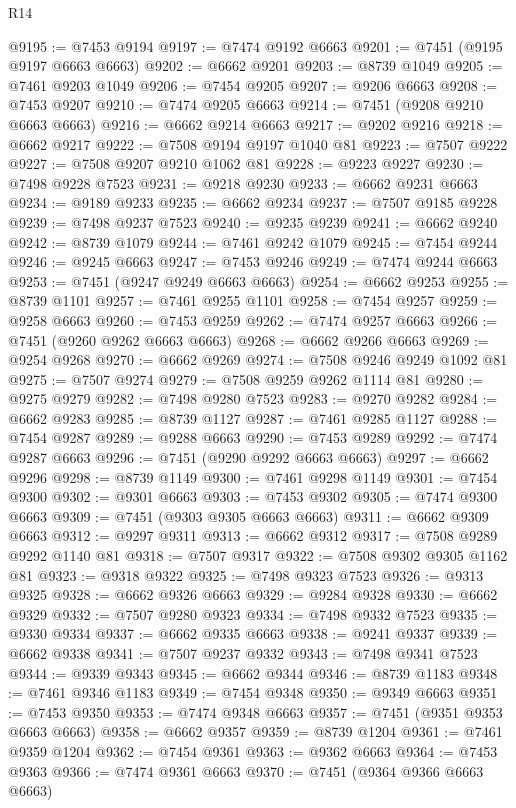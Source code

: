 \begin{lexlean}{R14}
\begin{coremodule}
{{{{{{{{{{{{{{{{{{{{{{{{{{{{{{{{{{{{{{{{{{{{{{{{{{{{{{{{{{{{{{{{{{{{{{{{{{{{{{{{{{@9195 := @7453 @9194
@9197 := @7474 @9192 @6663
@9201 := @7451 (@9195 @9197 @6663 @6663)
@9202 := @6662 @9201
@9203 := @8739 @1049
@9205 := @7461 @9203 @1049
@9206 := @7454 @9205
@9207 := @9206 @6663
@9208 := @7453 @9207
@9210 := @7474 @9205 @6663
@9214 := @7451 (@9208 @9210 @6663 @6663)
@9216 := @6662 @9214 @6663
@9217 := @9202 @9216
@9218 := @6662 @9217
@9222 := @7508 @9194 @9197 @1040 @81
@9223 := @7507 @9222
@9227 := @7508 @9207 @9210 @1062 @81
@9228 := @9223 @9227
@9230 := @7498 @9228 @7523
@9231 := @9218 @9230
@9233 := @6662 @9231 @6663
@9234 := @9189 @9233
@9235 := @6662 @9234
@9237 := @7507 @9185 @9228
@9239 := @7498 @9237 @7523
@9240 := @9235 @9239
@9241 := @6662 @9240
@9242 := @8739 @1079
@9244 := @7461 @9242 @1079
@9245 := @7454 @9244
@9246 := @9245 @6663
@9247 := @7453 @9246
@9249 := @7474 @9244 @6663
@9253 := @7451 (@9247 @9249 @6663 @6663)
@9254 := @6662 @9253
@9255 := @8739 @1101
@9257 := @7461 @9255 @1101
@9258 := @7454 @9257
@9259 := @9258 @6663
@9260 := @7453 @9259
@9262 := @7474 @9257 @6663
@9266 := @7451 (@9260 @9262 @6663 @6663)
@9268 := @6662 @9266 @6663
@9269 := @9254 @9268
@9270 := @6662 @9269
@9274 := @7508 @9246 @9249 @1092 @81
@9275 := @7507 @9274
@9279 := @7508 @9259 @9262 @1114 @81
@9280 := @9275 @9279
@9282 := @7498 @9280 @7523
@9283 := @9270 @9282
@9284 := @6662 @9283
@9285 := @8739 @1127
@9287 := @7461 @9285 @1127
@9288 := @7454 @9287
@9289 := @9288 @6663
@9290 := @7453 @9289
@9292 := @7474 @9287 @6663
@9296 := @7451 (@9290 @9292 @6663 @6663)
@9297 := @6662 @9296
@9298 := @8739 @1149
@9300 := @7461 @9298 @1149
@9301 := @7454 @9300
@9302 := @9301 @6663
@9303 := @7453 @9302
@9305 := @7474 @9300 @6663
@9309 := @7451 (@9303 @9305 @6663 @6663)
@9311 := @6662 @9309 @6663
@9312 := @9297 @9311
@9313 := @6662 @9312
@9317 := @7508 @9289 @9292 @1140 @81
@9318 := @7507 @9317
@9322 := @7508 @9302 @9305 @1162 @81
@9323 := @9318 @9322
@9325 := @7498 @9323 @7523
@9326 := @9313 @9325
@9328 := @6662 @9326 @6663
@9329 := @9284 @9328
@9330 := @6662 @9329
@9332 := @7507 @9280 @9323
@9334 := @7498 @9332 @7523
@9335 := @9330 @9334
@9337 := @6662 @9335 @6663
@9338 := @9241 @9337
@9339 := @6662 @9338
@9341 := @7507 @9237 @9332
@9343 := @7498 @9341 @7523
@9344 := @9339 @9343
@9345 := @6662 @9344
@9346 := @8739 @1183
@9348 := @7461 @9346 @1183
@9349 := @7454 @9348
@9350 := @9349 @6663
@9351 := @7453 @9350
@9353 := @7474 @9348 @6663
@9357 := @7451 (@9351 @9353 @6663 @6663)
@9358 := @6662 @9357
@9359 := @8739 @1204
@9361 := @7461 @9359 @1204
@9362 := @7454 @9361
@9363 := @9362 @6663
@9364 := @7453 @9363
@9366 := @7474 @9361 @6663
@9370 := @7451 (@9364 @9366 @6663 @6663)
}}}}}}}}}}}}}}}}}}}}}}}}}}}}}}}}}}}}}}}}}}}}}}}}}}}}}}}}}}}}}}}}}}}}}}}}}}}}}}}}}}
\end{coremodule}
\end{lexlean}
